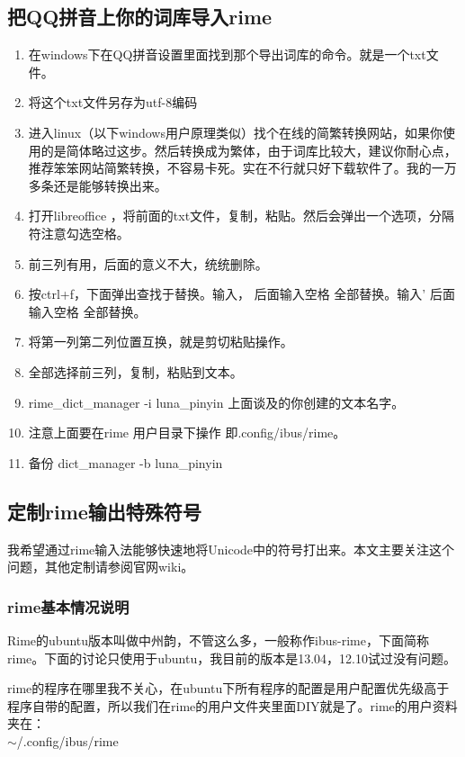 \documentclass[11pt,oneside]{book}
\begin{document}
\begin{common-format}
\subsection{把QQ拼音上你的词库导入rime}
\begin{enumerate}
\item 在windows下在QQ拼音设置里面找到那个导出词库的命令。就是一个txt文件。
\item 将这个txt文件另存为utf-8编码
\item 进入linux（以下windows用户原理类似）找个在线的简繁转换网站，如果你使用的是简体略过这步。然后转换成为繁体，由于词库比较大，建议你耐心点，推荐笨笨网站简繁转换，不容易卡死。实在不行就只好下载软件了。我的一万多条还是能够转换出来。
\item 打开libreoffice ，将前面的txt文件，复制，粘贴。然后会弹出一个选项，分隔符注意勾选空格。
\item 前三列有用，后面的意义不大，统统删除。
\item 按ctrl+f，下面弹出查找于替换。输入，  后面输入空格   全部替换。输入'     后面输入空格   全部替换。
\item 将第一列第二列位置互换，就是剪切粘贴操作。
\item 全部选择前三列，复制，粘贴到文本。
\item rime\_dict\_manager  -i luna\_pinyin   上面谈及的你创建的文本名字。
\item 注意上面要在rime 用户目录下操作  即.config/ibus/rime。
\item 备份   dict\_manager -b luna\_pinyin  
\end{enumerate}


\subsection{定制rime输出特殊符号}
\begin{fancycolorbox}
我希望通过rime输入法能够快速地将Unicode中的符号打出来。本文主要关注这个问题，其他定制请参阅官网wiki。
\end{fancycolorbox}


\subsubsection{rime基本情况说明}
Rime的ubuntu版本叫做中州韵，不管这么多，一般称作ibus-rime，下面简称rime。下面的讨论只使用于ubuntu，我目前的版本是13.04，12.10试过没有问题。

rime的程序在哪里我不关心，在ubuntu下所有程序的配置是用户配置优先级高于程序自带的配置，所以我们在rime的用户文件夹里面DIY就是了。rime的用户资料夹在：\\
$ \sim $/.config/ibus/rime



\end{common-format}
\end{document}
